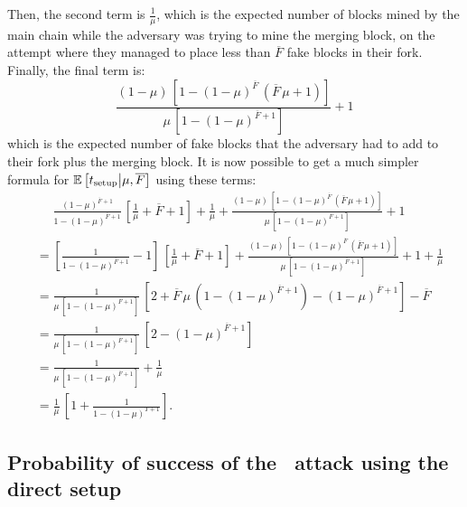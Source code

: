     Then, the second term is \(\frac{1}{\mu}\), which is the expected number of blocks mined by the main chain while the adversary was trying to mine the merging block, on the attempt where they managed to place less than \(\overline{F}\) fake blocks in their fork. Finally, the final term is:
    \[\frac{(1-\mu)\,\left[1-(1-\mu)^{\overline{F}}\,(\overline{F}\,\mu+1)\right]}{\mu\,\left[1 - (1-\mu)^{\overline{F}+1}\right]} + 1\]
    which is the expected number of fake blocks that the adversary had to add to their fork plus the merging block. It is now possible to get a much simpler formula for \(\mathbb{E}\left[t_{\text{setup}}\middle|\mu,\overline{F}\right]\) using these terms:
    \begin{align*}
         &\phantom{=}\frac{(1-\mu)^{\overline{F}+1}}{1 - (1-\mu)^{\overline{F}+1}}\,\left[\frac{1}{\mu}+\overline{F} + 1\right] + \frac{1}{\mu} + \frac{(1-\mu)\,\left[1-(1-\mu)^{\overline{F}}\,(\overline{F}\,\mu+1)\right]}{\mu\,\left[1 - (1-\mu)^{\overline{F}+1}\right]} + 1\\
        &= \left[\frac{1}{1-(1-\mu)^{\overline{F}+1}}-1\right]\,\left[\frac{1}{\mu}+\overline{F} + 1\right] + \frac{(1-\mu)\,\left[1-(1-\mu)^{\overline{F}}\,(\overline{F}\,\mu+1)\right]}{\mu\,\left[1 - (1-\mu)^{\overline{F}+1}\right]} + 1 + \frac{1}{\mu}\\
        &= \frac{1}{\mu\,\left[1-(1-\mu)^{\overline{F}+1}\right]}\,\left[2+\overline{F}\,\mu\,\left(1-(1-\mu)^{\overline{F}+1}\right)-(1-\mu)^{\overline{F}+1}\right] - \overline{F}\\
        &= \frac{1}{\mu\,\left[1-(1-\mu)^{\overline{F}+1}\right]}\,\left[2-(1-\mu)^{\overline{F}+1}\right]\\
        &= \frac{1}{\mu\,\left[1-(1-\mu)^{\overline{F}+1}\right]} + \frac{1}{\mu}\\
        &= \frac{1}{\mu}\,\left[1 + \frac{1}{1 - (1-\mu)^{T+1}}\right].
    \end{align*}
    
    \subsection{Probability of success of the \cs\ attack using the direct setup}
    

